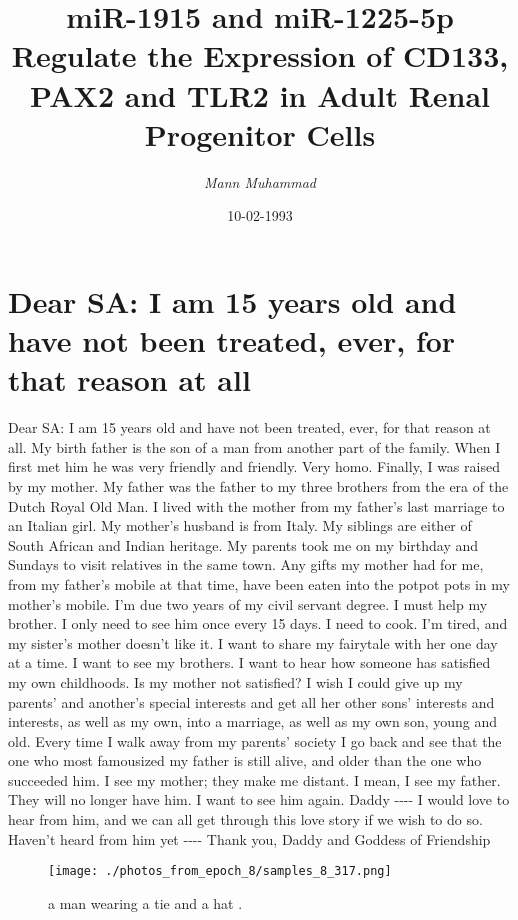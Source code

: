 \documentclass{article}%
\title{miR{-}1915 and miR{-}1225{-}5p Regulate the Expression of CD133, PAX2 and TLR2 in Adult Renal Progenitor Cells}%
\author{\textit{Mann Muhammad}}%
\date{10-02-1993}%
\begin{document}
%
\normalsize%
\maketitle%
\section{Dear SA:\newline%
I am 15 years old and have not been treated, ever, for that reason at all}%
\label{sec:DearSAIam15yearsoldandhavenotbeentreated,ever,forthatreasonatall}%
Dear SA:\newline%
I am 15 years old and have not been treated, ever, for that reason at all. My birth father is the son of a man from another part of the family. When I first met him he was very friendly and friendly. Very homo. Finally, I was raised by my mother. My father was the father to my three brothers from the era of the Dutch Royal Old Man. I lived with the mother from my father’s last marriage to an Italian girl. My mother’s husband is from Italy. My siblings are either of South African and Indian heritage. My parents took me on my birthday and Sundays to visit relatives in the same town. Any gifts my mother had for me, from my father’s mobile at that time, have been eaten into the potpot pots in my mother’s mobile.\newline%
I’m due two years of my civil servant degree. I must help my brother. I only need to see him once every 15 days. I need to cook. I’m tired, and my sister’s mother doesn’t like it. I want to share my fairytale with her one day at a time. I want to see my brothers. I want to hear how someone has satisfied my own childhoods.\newline%
Is my mother not satisfied? I wish I could give up my parents’ and another’s special interests and get all her other sons’ interests and interests, as well as my own, into a marriage, as well as my own son, young and old. Every time I walk away from my parents’ society I go back and see that the one who most famousized my father is still alive, and older than the one who succeeded him. I see my mother; they make me distant. I mean, I see my father. They will no longer have him. I want to see him again.\newline%
Daddy\newline%
{-}{-}{-}{-} I would love to hear from him, and we can all get through this love story if we wish to do so.\newline%
Haven’t heard from him yet\newline%
{-}{-}{-}{-} Thank you, Daddy and Goddess of Friendship\newline%

%


\begin{figure}[h!]%
\centering%
\texttt{[image: ./photos\_from\_epoch\_8/samples\_8\_317.png]}%
\caption{a man wearing a tie and a hat .}%
\end{figure}

%
\end{document}
